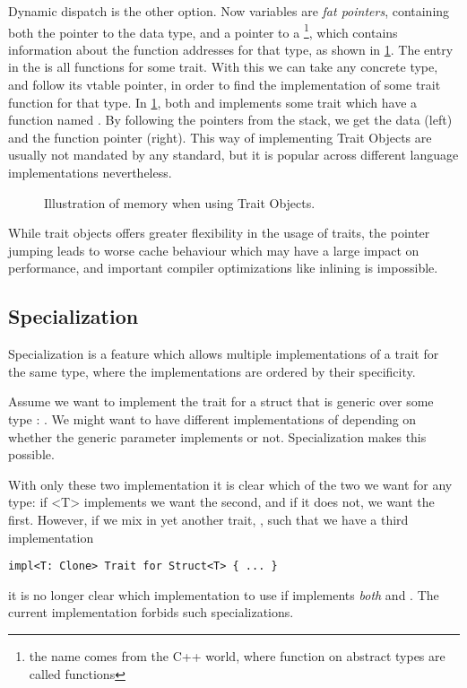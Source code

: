 Dynamic dispatch is the other option. Now variables are \emph{fat pointers}, containing both the
pointer to the data type, and a pointer to a \footnote{the name  comes
from the C++ world, where function on abstract types are called  functions}, which
contains information about the function addresses for that type, as shown in
\cref{fig:trait-objects}. The entry in the  is all functions for some trait. With this
we can take any concrete type, and follow its vtable pointer, in order to find the implementation
of some trait function for that type. In \cref{fig:trait-objects}, both  and 
implements some trait which have a function named . By following the pointers from the
stack, we get the data (left) and the function pointer (right). This way of implementing Trait
Objects are usually not mandated by any standard, but it is popular across different language
implementations nevertheless.

\begin{figure}[ht]
  \centering
  
  \caption{Illustration of memory when using Trait Objects.\label{fig:trait-objects}}
\end{figure}

While trait objects offers greater flexibility in the usage of traits, the pointer jumping leads to
worse cache behaviour which may have a large impact on performance, and important compiler
optimizations like inlining is impossible.



\subsection{Specialization\label{sec:specialization}}

Specialization is a feature which allows multiple implementations of a trait for the same type,
where the implementations are ordered by their specificity.

Assume we want to implement the trait  for a struct that is generic over some type
: . We might want to have different implementations of 
depending on whether the generic parameter  implements  or not.
Specialization makes this possible.


With only these two implementation it is clear which of the two we want for any type: if \code<T>
implements  we want the second, and if it does not, we want the first. However, if we
mix in yet another trait, , such that we have a third implementation
\begin{lstlisting}[style=Rust]
impl<T: Clone> Trait for Struct<T> { ... }
\end{lstlisting}
it is no longer clear which implementation to use if  implements \emph{both} 
and . The current implementation forbids such specializations.


